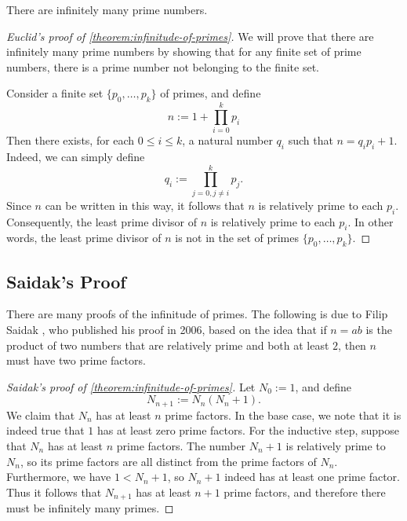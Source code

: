 \begin{theorem}\label{theorem:infinitude-of-primes}
  There are infinitely many prime numbers.
\end{theorem}

\begin{proof}[Euclid's proof of \cref{theorem:infinitude-of-primes}]
  We will prove that there are infinitely many prime numbers by showing that for any finite set of prime numbers, there is a prime number not belonging to the finite set.
  
  Consider a finite set $\{p_0,\ldots,p_k\}$ of primes, and define
  \begin{equation*}
    n:= 1+\prod_{i=0}^k p_i
  \end{equation*}
  Then there exists, for each $0\leq i\leq k$, a natural number $q_i$ such that $n=q_ip_i+1$. Indeed, we can simply define
  \begin{equation*}
    q_i := \prod_{j=0,j\neq i}^k p_j.
  \end{equation*}
  Since $n$ can be written in this way, it follows that $n$ is relatively prime to each $p_i$. Consequently, the least prime divisor of $n$ is relatively prime to each $p_i$. In other words, the least prime divisor of $n$ is not in the set of primes $\{p_0,\ldots,p_k\}$.
\end{proof}

\subsection*{Saidak's Proof}

There are many proofs of the infinitude of primes. The following is due to Filip Saidak \cite{Saidak2006}, who published his proof in 2006, based on the idea that if $n=ab$ is the product of two numbers that are relatively prime and both at least $2$, then $n$ must have two prime factors.

\begin{proof}[Saidak's proof of \cref{theorem:infinitude-of-primes}]
  Let $N_0:= 1$, and define
  \begin{equation*}
    N_{n+1} := N_n(N_n + 1).
  \end{equation*}
  We claim that $N_n$ has at least $n$ prime factors. In the base case, we note that it is indeed true that $1$ has at least zero prime factors. For the inductive step, suppose that $N_n$ has at least $n$ prime factors. The number $N_n+1$ is relatively prime to $N_n$, so its prime factors are all distinct from the prime factors of $N_n$. Furthermore, we have $1<N_n+1$, so $N_n+1$ indeed has at least one prime factor. Thus it follows that $N_{n+1}$ has at least $n+1$ prime factors, and therefore there must be infinitely many primes.
\end{proof}

